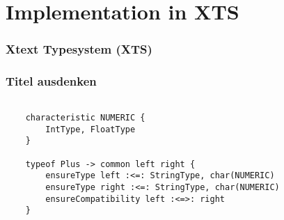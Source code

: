 \section[XTS]{Implementation in XTS}

\begin{frame}
\frametitle{Xtext Typesystem (XTS)}
\tableofcontents[currentsection]
\end{frame}


\begin{frame}
\frametitle{Titel ausdenken}

\begin{verbatim}

	characteristic NUMERIC {
		IntType, FloatType
	} 

 	typeof Plus -> common left right {
 		ensureType left :<=: StringType, char(NUMERIC)
 		ensureType right :<=: StringType, char(NUMERIC)
 		ensureCompatibility left :<=>: right
 	} 
\end{verbatim}

 	
 	
\end{frame}
